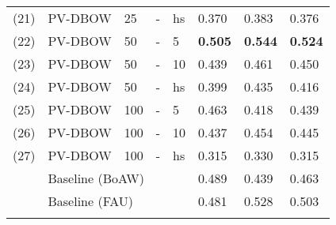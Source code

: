 \begin{table}[ht]
\begin{tabular}{l|l|p{1.2cm}|p{1.5cm}|p{1.6cm}|l|l|l}
         (21) & PV-DBOW & 25 & - & hs & 0.370 & 0.383 & 0.376 \\
         (22) & PV-DBOW & 50 & - & 5 & \textbf{0.505} & \textbf{0.544} & \textbf{0.524} \\
         (23) & PV-DBOW & 50 & - & 10 & 0.439 & 0.461 & 0.450 \\
         (24) & PV-DBOW & 50 & - & hs & 0.399 & 0.435 & 0.416 \\
         (25) & PV-DBOW & 100 & - & 5 & 0.463 & 0.418 & 0.439 \\
         (26) & PV-DBOW & 100 & - & 10 & 0.437 & 0.454 & 0.445 \\
         (27) & PV-DBOW & 100 & - & hs & 0.315 & 0.330 & 0.315 \\
         \hline
         & \multicolumn{4}{l|}{Baseline (BoAW)} & 0.489 & 0.439 & 0.463 \\
         & \multicolumn{4}{l|}{Baseline (FAU)} & 0.481 & 0.528 & 0.503 \\
         \Xhline{2\arrayrulewidth}
    \end{tabular}
    \label{tab:doc2vec_results}
\end{table}